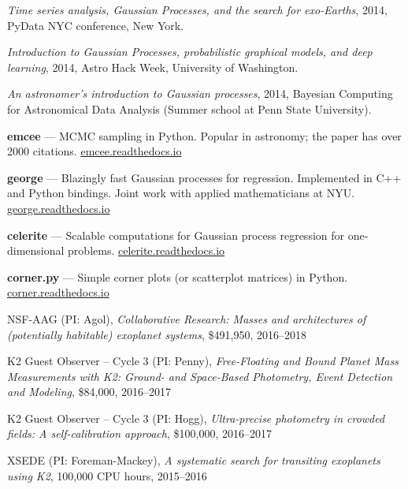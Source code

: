 \documentclass[12pt,letterpaper]{article}
\begin{document}
\begin{list}{}{\cvlist}
\item \emph{Time series analysis, Gaussian Processes, and the search for
            exo-Earths},
    2014, PyData NYC conference, New York.

\item \emph{Introduction to Gaussian Processes, probabilistic graphical
            models, and deep learning},
    2014, Astro Hack Week, University of Washington.

\item \emph{An astronomer's introduction to Gaussian processes},
    2014, Bayesian Computing for Astronomical Data Analysis (Summer school at
    Penn State University).

\end{list}

\begin{list}{}{\cvlist}

\item {\bf emcee} ---
    MCMC sampling in Python. Popular in astronomy;
    the paper has over 2000 citations.
    \url{emcee.readthedocs.io}

\item {\bf george} ---
    Blazingly fast Gaussian processes for regression. Implemented in C++ and
    Python bindings. Joint work with applied mathematicians at NYU.
    \url{george.readthedocs.io}

\item {\bf celerite} ---
    Scalable computations for Gaussian process regression for one-dimensional
    problems.
    \url{celerite.readthedocs.io}

\item {\bf corner.py} ---
    Simple corner plots (or scatterplot matrices) in Python.
    \url{corner.readthedocs.io}

\end{list}

\begin{list}{}{\cvlist}
\item
NSF-AAG (PI: Agol),
\emph{Collaborative Research: Masses and architectures of (potentially
    habitable) exoplanet systems},
\$491,950, 2016--2018
\item
K2 Guest Observer -- Cycle 3 (PI: Penny),
\emph{Free-Floating and Bound Planet Mass Measurements with K2: Ground- and
Space-Based Photometry, Event Detection and Modeling},
\$84,000, 2016--2017
\item
K2 Guest Observer -- Cycle 3 (PI: Hogg),
\emph{Ultra-precise photometry in crowded fields: A self-calibration
approach},
\$100,000, 2016--2017
\item
XSEDE (PI: Foreman-Mackey),
\emph{A systematic search for transiting exoplanets using K2},
100,000 CPU hours, 2015--2016
\end{list}
\end{document}

